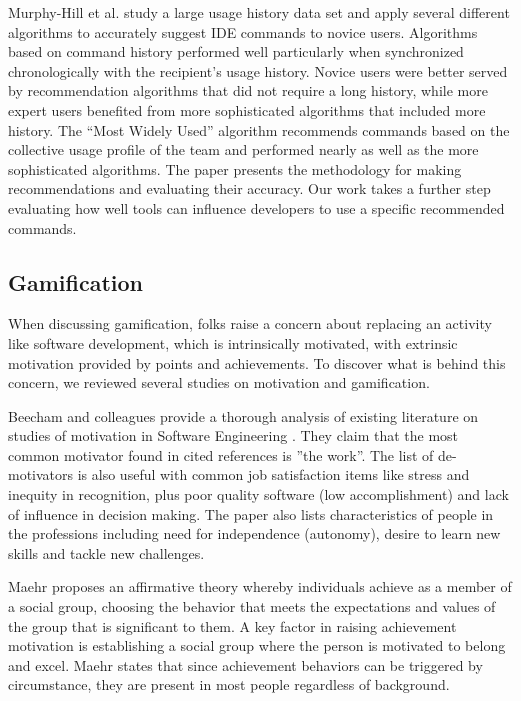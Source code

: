\documentclass{sig-alternate}
\begin{document}
Murphy-Hill et al. study a large usage history data set and apply several different algorithms to accurately suggest IDE commands to novice users\cite{MurphyHill2012Improving}.  Algorithms based on command history performed well particularly when synchronized chronologically with the recipient's usage history. Novice users were better served by recommendation algorithms that did not require a long history, while more expert users benefited from more sophisticated algorithms that included more history. The ``Most Widely Used'' algorithm recommends commands based on the collective usage profile of the team and performed nearly as well as the more sophisticated algorithms. The paper presents the methodology for making recommendations and evaluating their accuracy. Our work takes a further step evaluating how well tools can influence developers to use a specific recommended commands.

\subsection{Gamification}

When discussing gamification, folks raise a concern about replacing an activity like software development, which is intrinsically motivated, with extrinsic motivation provided by points and achievements.  To discover what is behind this concern, we reviewed several studies on motivation and gamification. 

Beecham and colleagues provide a thorough analysis of existing literature on studies of motivation in Software Engineering \cite{Beecham2008Motivation}.  They claim that the most common motivator found in cited references is ''the work''. The list of de-motivators is also useful with common job satisfaction items like stress and inequity in recognition, plus poor quality software (low accomplishment) and lack of influence in decision making. The paper also lists characteristics of people in the professions including need for independence (autonomy), desire to learn new skills and tackle new challenges. 

Maehr proposes an affirmative theory whereby  individuals achieve as a member of a social group, choosing the behavior that meets the expectations and values of the group that is significant to them\cite{wbsnipes:MaehrCulture}.  A key factor in raising achievement motivation is establishing a social group where the person is motivated to belong and excel.  Maehr states that since achievement behaviors can be triggered by circumstance, they are present in most people regardless of background. 
\end{document}
